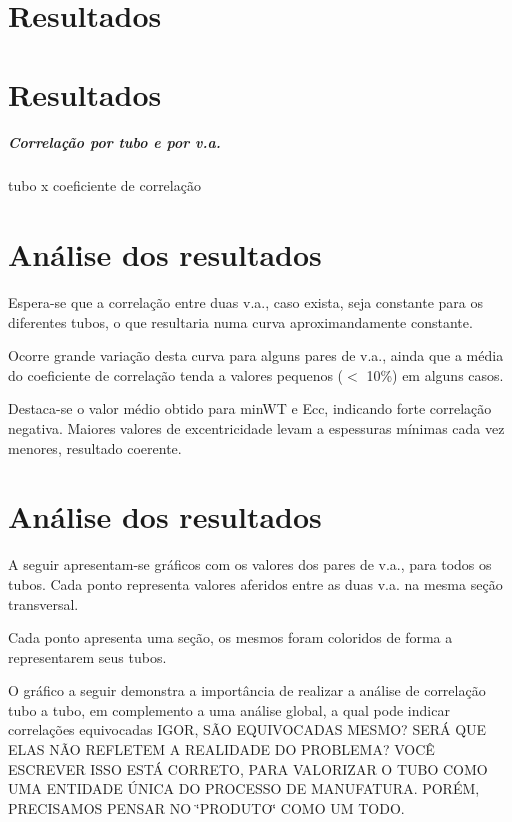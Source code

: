 \section*{Resultados}

\section*{Resultados}

\subparagraph*{Correlação por tubo e por v.\+a.}

tubo x coeficiente de correlação \subsection*{}





\section*{Análise dos resultados}

Espera-\/se que a correlação entre duas v.\+a., caso exista, seja constante para os diferentes tubos, o que resultaria numa curva aproximandamente constante.

Ocorre grande variação desta curva para alguns pares de v.\+a., ainda que a média do coeficiente de correlação tenda a valores pequenos ($<$ 10\%) em alguns casos.

Destaca-\/se o valor médio obtido para min\+WT e Ecc, indicando forte correlação negativa. Maiores valores de excentricidade levam a espessuras mínimas cada vez menores, resultado coerente. 



\section*{Análise dos resultados}

A seguir apresentam-\/se gráficos com os valores dos pares de v.\+a., para todos os tubos. Cada ponto representa valores aferidos entre as duas v.\+a. na mesma seção transversal.

Cada ponto apresenta uma seção, os mesmos foram coloridos de forma a representarem seus tubos.

O gráfico a seguir demonstra a importância de realizar a análise de correlação tubo a tubo, em complemento a uma análise global, a qual pode indicar correlações equivocadas I\+G\+OR, SÃO E\+Q\+U\+I\+V\+O\+C\+A\+D\+AS M\+E\+S\+MO? S\+E\+RÁ Q\+UE E\+L\+AS NÃO R\+E\+F\+L\+E\+T\+EM A R\+E\+A\+L\+I\+D\+A\+DE DO P\+R\+O\+B\+L\+E\+MA? V\+O\+CÊ E\+S\+C\+R\+E\+V\+ER I\+S\+SO E\+S\+TÁ C\+O\+R\+R\+E\+TO, P\+A\+RA V\+A\+L\+O\+R\+I\+Z\+AR O T\+U\+BO C\+O\+MO U\+MA E\+N\+T\+I\+D\+A\+DE Ú\+N\+I\+CA DO P\+R\+O\+C\+E\+S\+SO DE M\+A\+N\+U\+F\+A\+T\+U\+RA. P\+O\+RÉM, P\+R\+E\+C\+I\+S\+A\+M\+OS P\+E\+N\+S\+AR NO \char`\"{}\+P\+R\+O\+D\+U\+T\+O\char`\"{} C\+O\+MO UM T\+O\+DO. 



